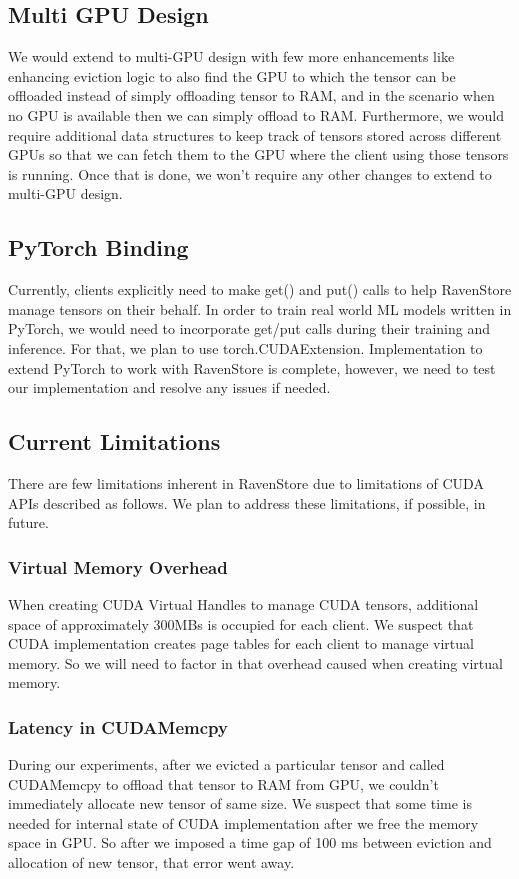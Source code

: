 \documentclass{article}
\begin{document}
\subsection{Multi GPU Design}
We would extend to multi-GPU design with few more enhancements like enhancing 
eviction logic to also find the GPU to which the tensor can be offloaded instead
of simply offloading tensor to RAM, and in the scenario when no GPU is available
then we can simply offload to RAM. Furthermore, we would require additional data structures
to keep track of tensors stored across different GPUs so that we can fetch them to the GPU
where the client using those tensors is running. Once that is done, we won't require
any other changes to extend to multi-GPU design.

\subsection{PyTorch Binding}
Currently, clients explicitly need to make get() and put() calls to help RavenStore
manage tensors on their behalf. In order to train real world ML models written in PyTorch,
we would need to incorporate get/put calls during their training and inference. For that, we
plan to use torch.CUDAExtension. Implementation to extend PyTorch to work with RavenStore is complete,
however, we need to test our implementation and resolve any issues if needed.

\subsection{Current Limitations}
There are few limitations inherent in RavenStore due to limitations of CUDA APIs described as follows.
We plan to address these limitations, if possible, in future.
\subsubsection{Virtual Memory Overhead}
When creating CUDA Virtual Handles to manage CUDA tensors, additional space of approximately 300MBs is occupied 
for each client. We suspect that CUDA implementation creates page tables for each client to manage virtual memory.
So we will need to factor in that overhead caused when creating virtual memory.
\subsubsection{Latency in CUDAMemcpy}
During our experiments, after we evicted a particular tensor and called CUDAMemcpy to offload that tensor to RAM from GPU,
we couldn't immediately allocate new tensor of same size. We suspect that some time is needed for internal state of CUDA implementation
after we free the memory space in GPU. So after we imposed a time gap of 100 ms between eviction and allocation of new tensor, that error
went away.
\end{document}
